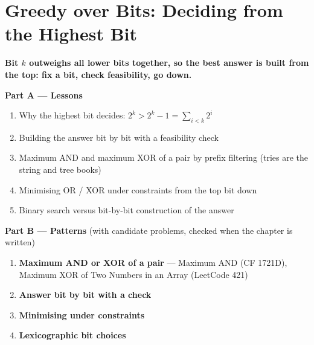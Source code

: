 \chapter{Greedy over Bits: Deciding from the Highest Bit}
\label{ch:greedy_bits}

\begin{tcolorbox}[enhanced, colback=white, colframe=secondaryblue, boxrule=1pt, arc=2mm]
\textbf{\large\textcolor{primaryblue}{Bit $k$ outweighs all lower bits together, so the best answer is built from the top: fix a bit, check feasibility, go down.}}
\end{tcolorbox}


\begin{plannedbox}
\textbf{Part A --- Lessons}
\begin{enumerate}[leftmargin=*, label=\textbf{A\arabic*.}, itemsep=1pt]
    \item Why the highest bit decides: $2^k > 2^k - 1 = \sum_{i<k} 2^i$
    \item Building the answer bit by bit with a feasibility check
    \item Maximum AND and maximum XOR of a pair by prefix filtering (tries are the string and tree books)
    \item Minimising OR / XOR under constraints from the top bit down
    \item Binary search versus bit-by-bit construction of the answer
\end{enumerate}
\textbf{Part B --- Patterns} (with candidate problems, checked when the chapter is written)
\begin{enumerate}[leftmargin=*, label=\textbf{P\arabic*.}, itemsep=1pt]
    \item \textbf{Maximum AND or XOR of a pair} --- Maximum AND {\small\color{darkgray}(CF 1721D)}, Maximum XOR of Two Numbers in an Array {\small\color{darkgray}(LeetCode 421)}
    \item \textbf{Answer bit by bit with a check}
    \item \textbf{Minimising under constraints}
    \item \textbf{Lexicographic bit choices}
\end{enumerate}
\end{plannedbox}
